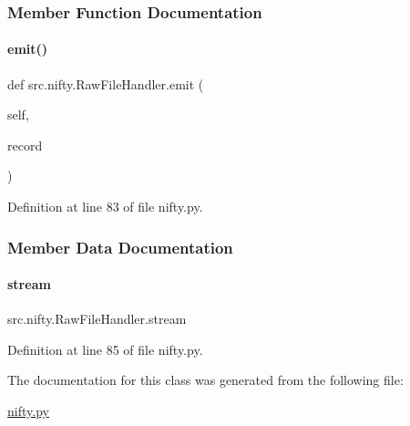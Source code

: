 \subsubsection{Member Function Documentation}
\mbox{\label{classsrc_1_1nifty_1_1RawFileHandler_ab16d960f29d6565ae529fbe6a062860c}} 
\paragraph{\texorpdfstring{emit()}{emit()}}
{\footnotesize\ttfamily def src.\+nifty.\+Raw\+File\+Handler.\+emit (\begin{DoxyParamCaption}\item[{}]{self,  }\item[{}]{record }\end{DoxyParamCaption})}



Definition at line 83 of file nifty.\+py.



\subsubsection{Member Data Documentation}
\mbox{\label{classsrc_1_1nifty_1_1RawFileHandler_a3031c89c30d8c07ec53e646b5002a229}} 
\paragraph{\texorpdfstring{stream}{stream}}
{\footnotesize\ttfamily src.\+nifty.\+Raw\+File\+Handler.\+stream}



Definition at line 85 of file nifty.\+py.



The documentation for this class was generated from the following file\+:\begin{DoxyCompactItemize}
\item 
\hyperlink{nifty_8py}{nifty.\+py}\end{DoxyCompactItemize}
